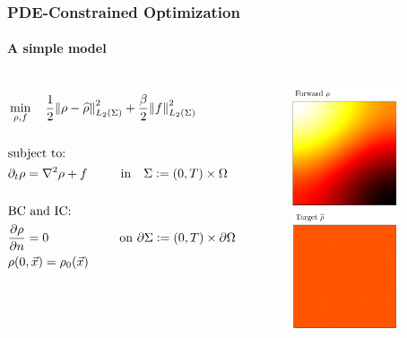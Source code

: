 \documentclass[aspectratio=169,xcolor=dvipsnames]{beamer}
\begin{document}
\begin{frame}
	\frametitle{PDE-Constrained Optimization}
	\framesubtitle{A simple model}
		\begin{columns}
			\begin{align*}
			&\min_{\rho,f} \quad \frac{1}{2}\norm{\rho- \widehat{\rho}}_{L_2(\Sigma)}^2 + 	\frac{\beta}{2} \norm{f}_{L_2(\Sigma)}^2\\
			\\ 
			&\text{subject to:}
			\\
			& \partial_t \rho = \nabla^2 \rho + f \ \qquad \text{  in    }\ \ \Sigma := 	(0,T) \times \Omega  \\
			\\
			&\text{BC } \text{and IC:}\\
			&\frac{\partial \rho}{\partial n}  = 0 \quad \ \ \qquad \qquad \text{on   } 	\partial \Sigma := (0,T) \times \partial \Omega  \\
			&\rho(0,\vec{x}) = \rho_0(\vec{x})
			\end{align*}
		\vspace{-0.8cm}
		\begin{figure}
			\includegraphics[width=3.2cm]{heat.png}
		\end{figure}
		\end{columns}
\end{frame}
\end{document}
